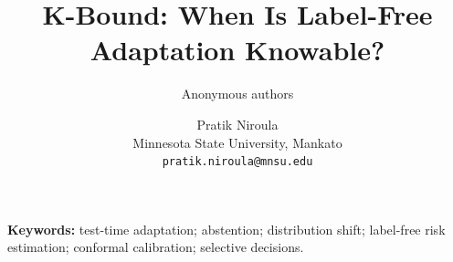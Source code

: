 \documentclass[11pt,twocolumn]{article}
\title{\vspace{-1.5em}\textbf{K-Bound: When Is Label-Free Adaptation Knowable?}}
\author{Anonymous authors}
\author{Pratik Niroula\\
  \small Minnesota State University, Mankato\\
  \small \texttt{pratik.niroula@mnsu.edu}}
\date{}
\theoremstyle{plain}
\theoremstyle{definition}
\theoremstyle{remark}
\begin{document}
\maketitle

\begin{abstract}

\end{abstract}

\noindent\textbf{Keywords:} test-time adaptation; abstention; distribution shift;
label-free risk estimation; conformal calibration; selective decisions.



{\scriptsize}

\clearpage

\end{document}
